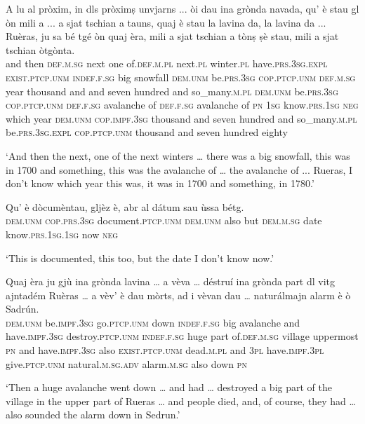 \begin{linenumbers}
\gll    A lu al pròxim, in dls pròximṣ unvjarns ... òi dau ina grònda navada, qu’ è stau gl òn mili a ... a sjat tschian a tauns, quaj è stau la lavina da, la lavina da ... Ruèras, ju sa bé tgé òn quaj èra, mili a sjat tschian a tònṣ ṣè stau, mili a sjat tschian òtgònta.\\
and then \textsc{def.m.sg} next one of.\textsc{def.m.pl} next.\textsc{pl} winter.\textsc{pl} {} have.\textsc{prs.3sg}.\textsc{expl} \textsc{exist.ptcp.unm} \textsc{indef.f.sg} big snowfall \textsc{dem.unm} be.\textsc{prs.3sg} \textsc{cop.ptcp.unm} \textsc{def.m.sg} year thousand and {} and seven hundred and so\_many.\textsc{m.pl} \textsc{dem.unm} be.\textsc{prs.3sg} \textsc{cop.ptcp.unm} \textsc{def.f.sg} avalanche of \textsc{def.f.sg} avalanche of {} \textsc{pn} \textsc{1sg}  know.\textsc{prs.1sg} \textsc{neg} which year \textsc{dem.unm} \textsc{cop.impf.3sg} thousand and seven hundred and so\_many.\textsc{m.pl} be.\textsc{prs.3sg}.\textsc{expl} \textsc{cop.ptcp.unm} thousand and seven hundred eighty\\
\end{linenumbers}
\medskip 
\glt `And then the next, one of the next winters … there was a big snowfall, this was in 1700 and something, this was the avalanche of … the avalanche of ... Rueras, I don’t know which year this was, it was in 1700 and something, in 1780.'
\medskip

\begin{linenumbers}
\gll Qu’ è dòcumèntau, gljèz è, abr al dátum sau ùssa bétg.\\
\textsc{dem.unm} \textsc{cop.prs.3sg} document.\textsc{ptcp.unm} \textsc{dem.unm} also but \textsc{dem.m.sg} date know.\textsc{prs.1sg.1sg} now \textsc{neg}\\
\end{linenumbers}
\medskip
\glt `This is documented, this too, but the date I don’t know now.' 

\begin{linenumbers}
\gll    Quaj èra ju gjù ina grònda lavina … a vèva … déstruí ina grònda part dl vitg ajntadém Ruèras … a vèv’ è dau mòrts, ad i vèvan dau … naturálmajn alarm è ò Sadrún.\\
\textsc{dem.unm} be.\textsc{impf.3sg} go.\textsc{ptcp.unm} down \textsc{indef.f.sg} big avalanche {} and have.\textsc{impf.3sg} {} destroy.\textsc{ptcp.unm} \textsc{indef.f.sg} huge part of.\textsc{def.m.sg} village uppermost \textsc{pn} {} and have.\textsc{impf.3sg} also \textsc{exist.ptcp.unm} dead.\textsc{m.pl} and \textsc{3pl} have.\textsc{impf.3pl} give.\textsc{ptcp.unm} {} natural.\textsc{m.sg.adv} alarm.\textsc{m.sg} also down \textsc{pn}\\
\end{linenumbers}
\medskip
\glt `Then a huge avalanche went down … and had … destroyed a big part of the village in the upper part of Rueras … and people died, and, of course, they had … also sounded the alarm down in Sedrun.'
\medskip

